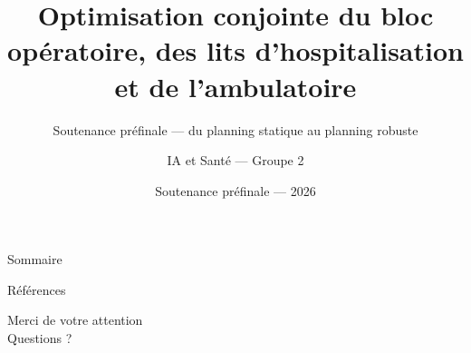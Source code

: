 \documentclass[aspectratio=169,11pt]{beamer}
\title[Bloc, lits \& ambulatoire]{Optimisation conjointe du bloc opératoire,
  des lits d'hospitalisation et de l'ambulatoire}
\subtitle{Soutenance préfinale --- du planning statique au planning robuste}
\author[IA \& Santé --- Groupe 2]{IA et Santé --- Groupe 2}
\date{Soutenance préfinale --- 2026}
\begin{document}
\begin{frame}
  \titlepage
\end{frame}

\begin{frame}{Sommaire}
  \tableofcontents
\end{frame}











\nocite{*}
\begin{frame}{Références}
  \footnotesize
  \printbibliography[heading=none]
\end{frame}

{
\begin{frame}
  \begin{center}
    \Large
    Merci de votre attention\\[0.5em]
    Questions ?
  \end{center}
\end{frame}
}
\end{document}
